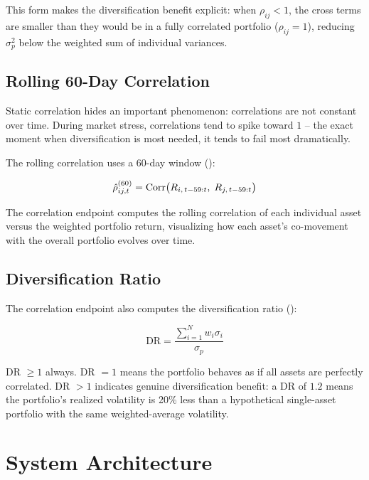 This form makes the diversification benefit explicit: when $\rho_{ij} < 1$, the cross terms are smaller than they would be in a fully correlated portfolio ($\rho_{ij} = 1$), reducing $\sigma_p^2$ below the weighted sum of individual variances.

\subsection{Rolling 60-Day Correlation}

Static correlation hides an important phenomenon: correlations are not constant over time. During market stress, correlations tend to spike toward $1$ -- the exact moment when diversification is most needed, it tends to fail most dramatically.

The rolling correlation uses a 60-day window ():

\begin{equation}
  \hat{\rho}_{ij,t}^{(60)} = \operatorname{Corr}\bigl(R_{i,\,t-59:t},\; R_{j,\,t-59:t}\bigr)
  \label{eq:rolling-corr}
\end{equation}

The correlation endpoint computes the rolling correlation of each individual asset versus the weighted portfolio return, visualizing how each asset's co-movement with the overall portfolio evolves over time.

\subsection{Diversification Ratio}

The correlation endpoint also computes the diversification ratio ():

\begin{equation}
  \text{DR} = \frac{\sum_{i=1}^{N} w_i \sigma_i}{\sigma_p}
  \label{eq:div-ratio}
\end{equation}

DR $\geq 1$ always. DR $= 1$ means the portfolio behaves as if all assets are perfectly correlated. DR $> 1$ indicates genuine diversification benefit: a DR of $1.2$ means the portfolio's realized volatility is 20\% less than a hypothetical single-asset portfolio with the same weighted-average volatility.

\section{System Architecture}
\label{sec:portfolio-architecture}


